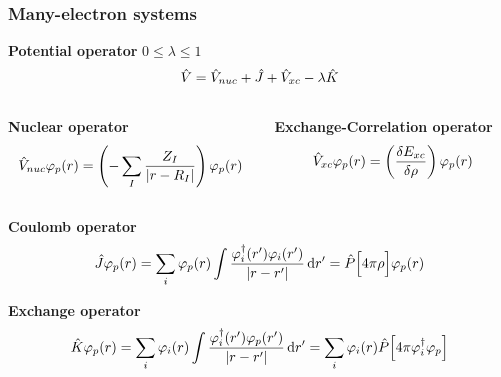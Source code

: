 \begin{frame}
  \frametitle{Many-electron systems}
  \centering
  \normalsize
  \textbf{Potential operator} $0 \leq \lambda \leq 1$
  \begin{equation}
    \nonumber
    \hat{V} = \hat{V}_{nuc} + \hat{J} + \hat{V}_{xc} - \lambda\hat{K}
  \end{equation}

  \vspace{8mm}

  \begin{columns}
    \begin{column}[b]{0.5\textwidth}
      \centering
      \textbf{Nuclear operator}
      \begin{equation}
        \nonumber
	    \hat{V}_{nuc} \varphi_p(r) = \left(-\sum_I\frac{Z_I}{|r-R_I|}\right) \varphi_p(r)
      \end{equation}
    \end{column}

    \begin{column}[b]{0.5\textwidth}
      \centering
      \textbf{Exchange-Correlation operator}
      \begin{equation}
        \nonumber
        \hat{V}_{xc} \varphi_p(r) = \left(\frac{\delta E_{xc}}{\delta \rho}\right) \varphi_p(r)
      \end{equation}
    \end{column}
  \end{columns}

  \vspace{8mm}

  \centering
  \textbf{Coulomb operator}
  \begin{equation}
    \nonumber
    \hat{J}\varphi_p(r) = \sum_i \varphi_p(r) \int \frac{\varphi_i^\dagger(r')\varphi_i(r')}{|r-r'|} \,\mathrm{d} r'
                          = \hat{P}\Big[4\pi\rho\Big] \varphi_p(r)
  \end{equation}

  \vspace{5mm}

  \centering
  \textbf{Exchange operator}
  \begin{equation}
    \nonumber
    \hat{K}\varphi_p(r) = \sum_i \varphi_i(r) \int \frac{\varphi_i^\dagger(r')\varphi_p(r')}{|r-r'|} \,\mathrm{d} r'
                           = \sum_i \varphi_i(r) \hat{P}\Big[4\pi\varphi_i^\dagger \varphi_p\Big]
  \end{equation}
\end{frame}

